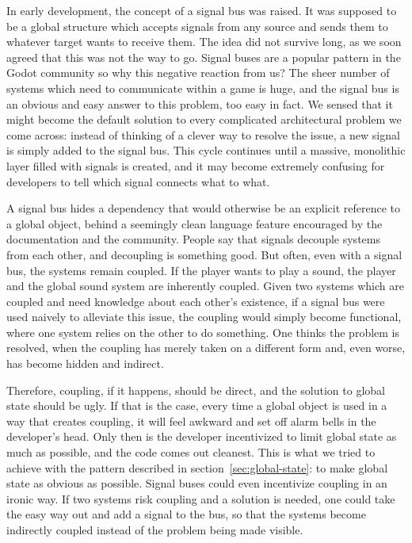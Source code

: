 \documentclass[../Main.tex]{subfiles}
\begin{document}
In early development, the concept of a signal bus was raised. It was supposed to be a global structure which accepts signals from any source and sends them to whatever target wants to receive them. The idea did not survive long, as we soon agreed that this was not the way to go. Signal buses are a popular pattern in the Godot community\autocite[]{gdquest_eventbus}\autocite[]{reddit_signalbuses} so why this negative reaction from us? The sheer number of systems which need to communicate within a game is huge, and the signal bus is an obvious and easy answer to this problem, too easy in fact. We sensed that it might become the default solution to every complicated architectural problem we come across: instead of thinking of a clever way to resolve the issue, a new signal is simply added to the signal bus. This cycle continues until a massive, monolithic layer filled with signals is created, and it may become extremely confusing for developers to tell which signal connects what to what.

A signal bus hides a dependency that would otherwise be an explicit reference to a global object, behind a seemingly clean language feature encouraged by the documentation and the community. People say that signals decouple systems from each other, and decoupling is something good. But often, even with a signal bus, the systems remain coupled. If the player wants to play a sound, the player and the global sound system are inherently coupled. Given two systems which are coupled and need knowledge about each other's existence, if a signal bus were used naively to alleviate this issue, the coupling would simply become functional, where one system relies on the other to do something. One thinks the problem is resolved, when the coupling has merely taken on a different form and, even worse, has become hidden and indirect.

Therefore, coupling, if it happens, should be direct, and the solution to global state should be ugly. If that is the case, every time a global object is used in a way that creates coupling, it will feel awkward and set off alarm bells in the developer's head. Only then is the developer incentivized to limit global state as much as possible, and the code comes out cleanest. This is what we tried to achieve with the pattern described in section~\ref{sec:global-state}: to make global state as obvious as possible. Signal buses could even incentivize coupling in an ironic way. If two systems risk coupling and a solution is needed, one could take the easy way out and add a signal to the bus, so that the systems become indirectly coupled instead of the problem being made visible.
\end{document}
